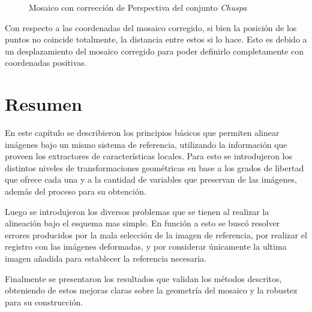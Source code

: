 \begin{figure}[H]
	\centering     %
	\hspace{1mm}%
	\caption[Mosaico con corrección de Perspectiva]{Mosaico con corrección de Perspectiva del conjunto \textit{Chuspa}}
	\label{imagen:ec:0234_3}
\end{figure}

Con respecto a las coordenadas del mosaico corregido, si bien la posición de los puntos no coincide totalmente, la distancia entre estos si lo hace. Esto es debido a un desplazamiento del mosaico corregido para poder definirlo completamente con coordenadas positivas. 

\section{Resumen}

En este capítulo se describieron los principios básicos que permiten alinear imágenes bajo un mismo sistema de referencia, utilizando la información que proveen los extractores de características locales. Para esto se introdujeron los distintos niveles de transformaciones geométricas en base a los grados de libertad que ofrece cada una y a la cantidad de variables que preservan de las imágenes, además del proceso para su obtención.

Luego se introdujeron los diversos problemas que se tienen al realizar la alineación bajo el esquema mas simple. En función a esto se buscó resolver errores producidos por la mala selección de la imagen de referencia, por realizar el registro con las imágenes deformadas, y por considerar únicamente la ultima imagen añadida para establecer la referencia necesaria.

Finalmente se presentaron los resultados que validan los métodos descritos, obteniendo de estos mejoras claras sobre la geometría del mosaico y la robustez para su construcción.


